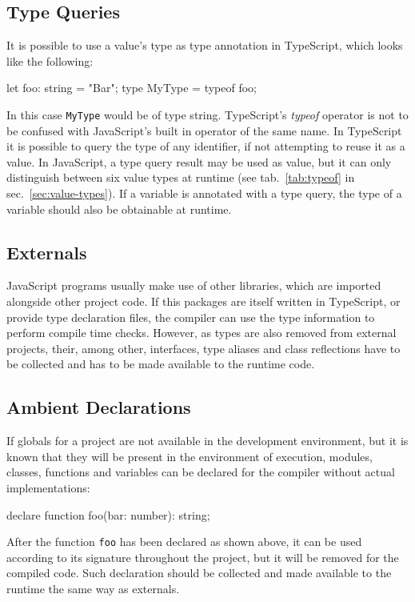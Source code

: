 
\subsection{Type Queries}

It is possible to use a value's type as type annotation in TypeScript, which looks like the following:
\begin{JsCode}[numbers=none]
let foo: string = "Bar";
type MyType = typeof foo;
\end{JsCode}
In this case \texttt{MyType} would be of type string. TypeScript's \emph{typeof} operator is not to be confused with JavaScript's built in operator of the same name. In TypeScript it is possible to query the type of any identifier, if not attempting to reuse it as a value. In JavaScript, a type query result may be used as value, but it can only distinguish between six value types at runtime (see tab.~\ref{tab:typeof} in sec.~\ref{sec:value-types}). If a variable is annotated with a type query, the type of a variable should also be obtainable at runtime.

\subsection{Externals}

JavaScript programs usually make use of other libraries, which are imported alongside 
other project code. If this packages are itself written in TypeScript, or provide type declaration files, the compiler can use the type information to perform compile time checks. However, as types are also removed from external projects, their, among other, interfaces, type aliases and class reflections have to be collected and has to be made available to the runtime code.

\subsection{Ambient Declarations}

If globals for a project are not available in the development environment, but it is known that they will be present in the environment of execution, modules, classes, functions and variables can be declared for the compiler without actual implementations:
\begin{JsCode}[numbers=none]
declare function foo(bar: number): string;
\end{JsCode}
After the function \texttt{foo} has been declared as shown above, it can be used according to its signature throughout the project, but it will be removed for the compiled code. Such declaration should be collected and made available to the runtime the same way as externals.

